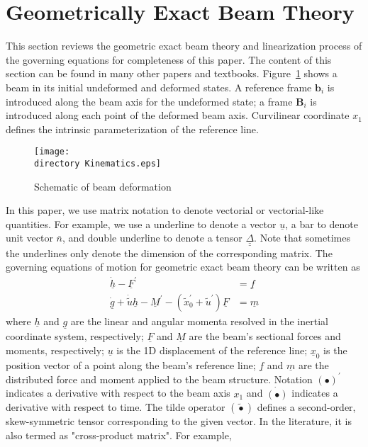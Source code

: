\documentclass{aiaa-tc}
\def\directory{EPSF/}
\renewcommand{\vec}[1]{\underline{#1}}
\renewcommand{\skew}[1]{\widetilde{#1}}
\begin{document}
\section{Geometrically Exact Beam Theory}
This section reviews the geometric exact beam theory and linearization process of the governing equations for completeness of this paper. The content of this section can be found in many other papers and textbooks.
Figure~\ref{Kinematics} shows a beam in its initial undeformed
and deformed states. A reference frame $\mathbf{b}_i$ is introduced along the
beam axis for the undeformed state; a frame $\mathbf{B}_i$ is introduced
along each point of the deformed beam axis. Curvilinear coordinate $x_1$ defines the intrinsic parameterization of the reference line.
\begin{figure}
\centering
\texttt{[image: \\directory Kinematics.eps]}
\caption{Schematic of beam deformation} \label{Kinematics}
\end{figure}
In this paper, we use matrix notation to denote vectorial or vectorial-like quantities. For example, we use a underline to denote a vector $\underline{u}$, a bar to denote unit vector $\bar{n}$, and double underline to denote a tensor $\underline{\underline{\Delta}}$. Note that sometimes the underlines only denote the dimension of the corresponding matrix. The governing equations of motion for geometric exact beam theory can be written as \cite{Bauchau:2010}
\begin{align}
	\label{GovernGEBT-1}
	\dot{\underline{h}} - \underline{F}^\prime &= \underline{f} \\
	\label{GovernGEBT-2}
	\dot{\underline{g}} + \dot{\tilde{u}} \underline{h} - \underline{M}^\prime - (\tilde{x}_0^\prime + \tilde{u}^\prime) \underline{F} &= \underline{m}
\end{align}
where $\vec{h}$ and $\vec{g}$ are the linear and angular momenta resolved in the inertial coordinate system, respectively; $\vec{F}$ and $\vec{M}$ are the beam's sectional forces and moments, respectively; $\vec{u}$ is the 1D displacement of the reference line; $\vec{x}_0$ is the position vector of a point along the beam's reference line; $\vec{f}$ and $\vec{m}$ are the distributed force and moment applied to the beam structure.  Notation $(\bullet)^\prime$ indicates a derivative with respect to the beam axis $x_1$ and $\dot{(\bullet)}$ indicates a derivative with respect to time. The tilde operator $(\skew{\bullet})$ defines a second-order, skew-symmetric tensor corresponding to the given vector. In the literature, it is also termed as "cross-product matrix". For example,
\end{document}
